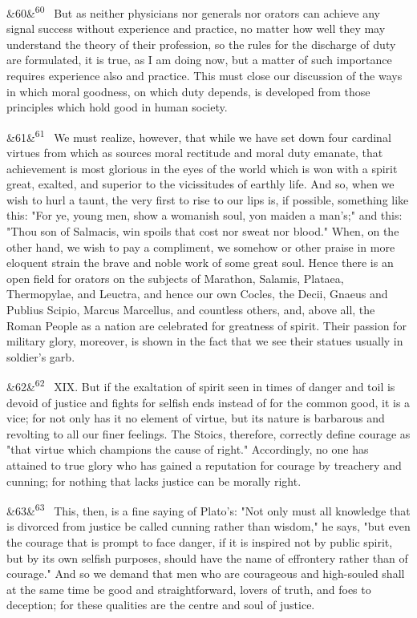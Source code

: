 \documentclass[12pt]{article}
\newcommand{\para}[1][]{\par\noindent\ifx&#1&\else\textsuperscript{\footnotesize #1}~\fi}
\begin{document}
\para[60] But as neither physicians nor generals nor orators can achieve any signal success without experience and practice, no matter how well they may understand the theory of their profession, so the rules for the discharge of duty are formulated, it is true, as I am doing now, but a matter of such importance requires experience also and practice. This must close our discussion of the ways in which moral goodness, on which duty depends, is developed from those principles which hold good in human society.

\para[61] We must realize, however, that while we have set down four cardinal virtues from which as sources moral rectitude and moral duty emanate, that achievement is most glorious in the eyes of the world which is won with a spirit great, exalted, and superior to the vicissitudes of earthly life. And so, when we wish to hurl a taunt, the very first to rise to our lips is, if possible, something like this: "For ye, young men, show a womanish soul, yon maiden a man's;" and this: "Thou son of Salmacis, win spoils that cost nor sweat nor blood." When, on the other hand, we wish to pay a compliment, we somehow or other praise in more eloquent strain the brave and noble work of some great soul. Hence there is an open field for orators on the subjects of Marathon, Salamis, Plataea, Thermopylae, and Leuctra, and hence our own Cocles, the Decii, Gnaeus and Publius Scipio, Marcus Marcellus, and countless others, and, above all, the Roman People as a nation are celebrated for greatness of spirit. Their passion for military glory, moreover, is shown in the fact that we see their statues usually in soldier's garb.

\para[62] XIX. But if the exaltation of spirit seen in times of danger and toil is devoid of justice and fights for selfish ends instead of for the common good, it is a vice; for not only has it no element of virtue, but its nature is barbarous and revolting to all our finer feelings. The Stoics, therefore, correctly define courage as "that virtue which champions the cause of right." Accordingly, no one has attained to true glory who has gained a reputation for courage by treachery and cunning; for nothing that lacks justice can be morally right.

\para[63] This, then, is a fine saying of Plato's: "Not only must all knowledge that is divorced from justice be called cunning rather than wisdom," he says, "but even the courage that is prompt to face danger, if it is inspired not by public spirit, but by its own selfish purposes, should have the name of effrontery rather than of courage." And so we demand that men who are courageous and high-souled shall at the same time be good and straightforward, lovers of truth, and foes to deception; for these qualities are the centre and soul of justice.
\end{document}
